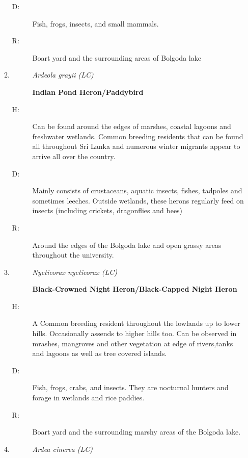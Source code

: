 \begin{itemize}
\begin{enumerate}
\begin{description}
\item[D: ]%
Fish, frogs, insects, and small mammals.%
\item[R: ]%
Boart yard and the surrounding areas of Bolgoda lake%
\end{description}%
\item%
\begin{description}%
\item[]%
\textit{Ardeola grayii (LC)}%
\item[]%
\textbf{Indian Pond Heron/Paddybird}%
\end{description}%
\begin{description}%
\item[H: ]%
Can be found around the edges of marshes, coastal lagoons and freshwater wetlands. Common breeding residents that can be found all throughout Sri Lanka and numerous winter migrants appear to arrive all over the country. %
\item[D: ]%
Mainly consists of crustaceans, aquatic insects, fishes, tadpoles and sometimes leeches. Outside wetlands, these herons regularly feed on insects (including crickets, dragonflies and bees)%
\item[R: ]%
Around the edges of the Bolgoda lake and open grassy areas throughout the university.%
\end{description}%
\item%
\begin{description}%
\item[]%
\textit{Nycticorax nycticorax (LC)}%
\item[]%
\textbf{Black{-}Crowned Night Heron/Black{-}Capped Night Heron}%
\end{description}%
\begin{description}%
\item[H: ]%
A Common breeding resident throughout the lowlands  up to lower hills. Occasionally assends to higher hills too. Can be observed in mrashes, mangroves and other vegetation at edge of rivers,tanks and lagoons as well as tree covered islands.%
\item[D: ]%
Fish, frogs, crabs, and insects. They are nocturnal hunters and forage in wetlands and rice paddies.%
\item[R: ]%
Boart yard and the surrounding marshy areas of the Bolgoda lake. %
\end{description}%
\item%
\begin{description}%
\item[]%
\textit{Ardea cinerea (LC)}%

\end{description}
\end{enumerate}
\end{itemize}
